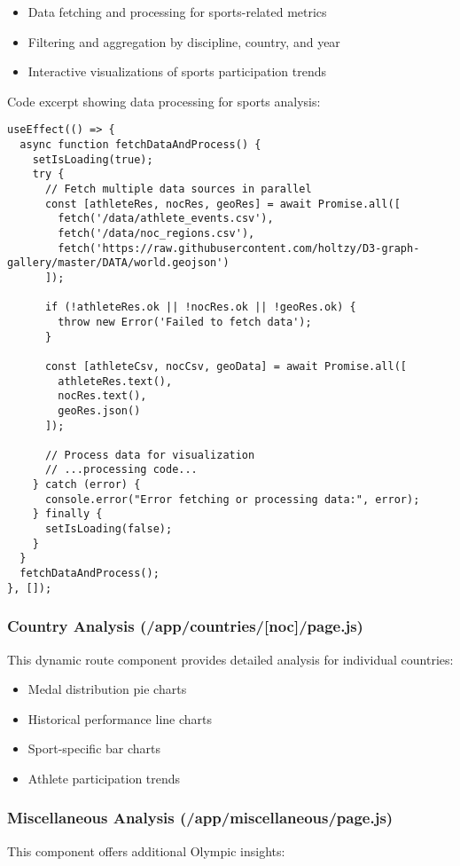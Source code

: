 \documentclass[a4paper, 12pt]{article}
\begin{document}
\begin{itemize}[leftmargin=*]
    \item Data fetching and processing for sports-related metrics
    \item Filtering and aggregation by discipline, country, and year
    \item Interactive visualizations of sports participation trends
\end{itemize}

Code excerpt showing data processing for sports analysis:

\begin{verbatim}
useEffect(() => {
  async function fetchDataAndProcess() {
    setIsLoading(true);
    try {
      // Fetch multiple data sources in parallel
      const [athleteRes, nocRes, geoRes] = await Promise.all([
        fetch('/data/athlete_events.csv'),
        fetch('/data/noc_regions.csv'),
        fetch('https://raw.githubusercontent.com/holtzy/D3-graph-gallery/master/DATA/world.geojson')
      ]);

      if (!athleteRes.ok || !nocRes.ok || !geoRes.ok) {
        throw new Error('Failed to fetch data');
      }

      const [athleteCsv, nocCsv, geoData] = await Promise.all([
        athleteRes.text(),
        nocRes.text(),
        geoRes.json()
      ]);

      // Process data for visualization
      // ...processing code...
    } catch (error) {
      console.error("Error fetching or processing data:", error);
    } finally {
      setIsLoading(false);
    }
  }
  fetchDataAndProcess();
}, []);
\end{verbatim}

\subsubsection{Country Analysis (/app/countries/[noc]/page.js)}
This dynamic route component provides detailed analysis for individual countries:

\begin{itemize}[leftmargin=*]
    \item Medal distribution pie charts
    \item Historical performance line charts
    \item Sport-specific bar charts
    \item Athlete participation trends
\end{itemize}

\subsubsection{Miscellaneous Analysis (/app/miscellaneous/page.js)}
This component offers additional Olympic insights:
\end{document}
